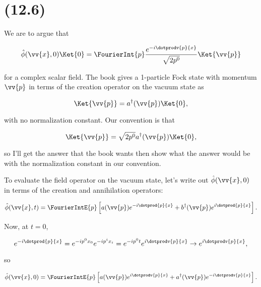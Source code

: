 \section{(12.6)}


\begin{parts}
\item We are to argue that


\begin{equation}
    \hat{\phi}(\vv{x},0) \Ket{0} = \FourierInt{p} \frac{e^{-i\dotprodv{p}{x}}}{\sqrt{2p^0}} \Ket{\vv{p}}
\end{equation}

for a complex scalar field. The book gives a 1-particle Fock state with momentum $\vv{p}$ in terms of the creation operator on the vacuum state as

\begin{equation}
    \Ket{\vv{p}} = a^{\dagger}(\vv{p}) \Ket{0},
\end{equation}

with no normalization constant. Our convention is that

\begin{equation}
    \Ket{\vv{p}} = \sqrt{2p^0} a^{\dagger}(\vv{p}) \Ket{0},
\end{equation}

so I'll get the answer that the book wants then show what the answer would be with the normalization constant in our convention.

To evaluate the field operator on the vacuum state, let's write out $\hat{\phi}(\vv{x},0)$ in terms of the creation and annihilation operators:

\begin{equation*}
    \hat{\phi}(\vv{x},t) = \FourierIntE{p} \left[ a(\vv{p})e^{-i\dotprod{p}{x}} + b^{\dagger}(\vv{p})e^{i\dotprod{p}{x}} \right].
\end{equation*}

Now, at $t=0$,

\begin{equation*}
    e^{-i\dotprod{p}{x}} = e^{-ip^0x_0}e^{-ip^ix_i} = e^{-ip^0t}e^{i\dotprodv{p}{x}} \rightarrow e^{i\dotprodv{p}{x}},
\end{equation*}

so

\begin{equation*}
    \hat{\phi}(\vv{x},0) = \FourierIntE{p} \left[ a(\vv{p})e^{i\dotprodv{p}{x}} + a^{\dagger}(\vv{p})e^{-i\dotprodv{p}{x}} \right].
\end{equation*}


\end{parts}

